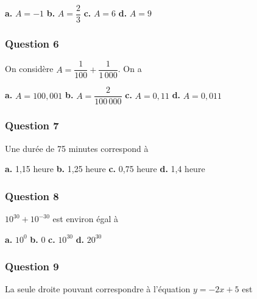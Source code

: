 \documentclass[10pt]{article}
\begin{document}
\textbf{a.} $A = -1$ \hfill \textbf{b.} $A = \dfrac{2}{3}$ \hfill \textbf{c.} $A = 6$ \hfill \textbf{d.} $A = 9$

\subsubsection*{Question 6}
On considère $A = \dfrac{1}{100} + \dfrac{1}{1\,000}$. On a

\textbf{a.} $A = 100,001$ \hfill \textbf{b.} $A = \dfrac{2}{100\,000}$ \hfill \textbf{c.} $A = 0,11$ \hfill \textbf{d.} $A = 0,011$

\subsubsection*{Question 7}
Une durée de 75 minutes correspond à

\textbf{a.} 1,15 heure \hfill \textbf{b.} 1,25 heure \hfill \textbf{c.} 0,75 heure \hfill \textbf{d.} 1,4 heure

\subsubsection*{Question 8}
$10^{30} + 10^{-30}$ est environ égal à

\textbf{a.} $10^0$ \hfill \textbf{b.} 0 \hfill \textbf{c.} $10^{30}$ \hfill \textbf{d.} $20^{30}$

\subsubsection*{Question 9}
La seule droite pouvant correspondre à l'équation $y = -2x + 5$ est
\end{document}
